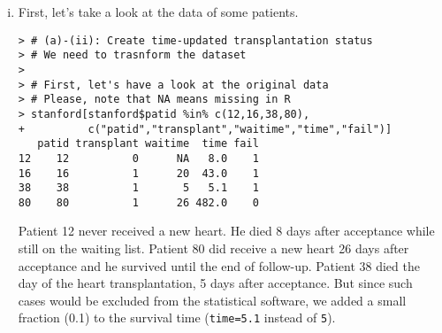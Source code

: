 \begin{enumerate}[(a)]
\begin{enumerate}[(i)]
\begin{spacing}{1.2}
\begin{footnotesize}
\begin{verbatim}
           exp(coef) exp(-coef) lower .95 upper .95
transplant    0.2661      3.758     0.165    0.4291

Concordance= 0.668  (se = 0.026 )
Rsquare= 0.223   (max possible= 0.997 )
Likelihood ratio test= 25.96  on 1 df,   p=3.481e-07
Wald test            = 29.49  on 1 df,   p=5.627e-08
Score (logrank) test = 33.41  on 1 df,   p=7.463e-09
\end{verbatim}
\end{footnotesize}
\end{spacing}
The estimated coefficient is associated with a hazard ratio of 0.266, which implies 
that patients with a new heart have about 4 times less hazard to die than those without 
a new heart. Thus, this analysis shows a strong beneficial effect of hearth transplantation on the hazard of death. However, such an approach is extremely likely to lead to misleading inferences as it does not account for the fact that a very high hazard is likely to follow transplantation. 

Also, there is another serious problem regarding this analysis. The previous analysis handles transplantation status as a fixed baseline covariate, i.e. it's treating patients who got a new hearth as if they had undergone the transplantation at baseline (acceptance time).
But in fact, at baseline, no one had received a new hearth. They had to survive up to the point that an
organ became available in order to receive a transplant.  
\item First, let's take a 
look at the data of some patients.
\begin{spacing}{1.2}
\begin{footnotesize}
\begin{verbatim}
> # (a)-(ii): Create time-updated transplantation status
> # We need to trasnform the dataset
> 
> # First, let's have a look at the original data
> # Please, note that NA means missing in R
> stanford[stanford$patid %in% c(12,16,38,80),
+          c("patid","transplant","waitime","time","fail")]
   patid transplant waitime  time fail
12    12          0      NA   8.0    1
16    16          1      20  43.0    1
38    38          1       5   5.1    1
80    80          1      26 482.0    0
\end{verbatim}
\end{footnotesize}
\end{spacing}
Patient 12 never received a new heart. He died 8 days after acceptance while still on 
the waiting list. Patient 80 did receive a new heart 26 days after acceptance and he 
survived until the end of follow-up. Patient 38 died the day of the heart 
transplantation, 5 days after acceptance. But since such cases would be excluded from the 
statistical software, we added a small fraction (0.1) to the survival time (\verb|time=5.1| 
instead of \verb|5|).


\end{enumerate}
\end{enumerate}
